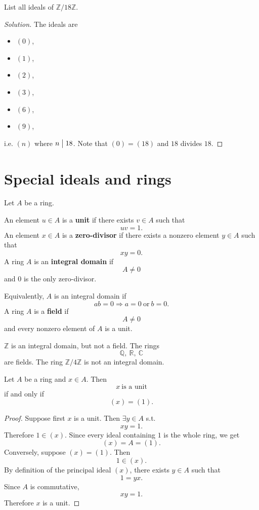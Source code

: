 \documentclass[11pt]{article}
\begin{document}
\begin{prob}
    List all ideals of $\mathbb Z/18\mathbb Z$. 
\end{prob}
\begin{proof}[Solution]
    The ideals are 
    \begin{itemize}
        \item $(0)$, 
        \item $(1)$,
        \item $(2)$, 
        \item $(3)$, 
        \item $(6)$, 
        \item $(9)$,  
    \end{itemize}
    i.e. $(n)$ where $n \bigm| 18$. 
    Note that $(0) = (18)$ and $18$ divides $18$.
\end{proof}

\section{Special ideals and rings}

\begin{defn}
    Let $A$ be a ring. 

    An element $u \in A$ is a \textbf{unit} if there 
    exists $v \in A$ such that 
    \[
        uv = 1.
    \]
    An element $x \in A$ is a \textbf{zero-divisor} 
    if there exists a nonzero element $y \in A$ 
    such that 
    \[
        xy = 0.
    \]
    A ring $A$ is an \textbf{integral domain} if 
    \[
        A \neq 0
    \]
    and $0$ is the only zero-divisor. 

    Equivalently, $A$ is an integral domain if 
    \[
        ab = 0 \Rightarrow a = 0 \ \text{or} \ b = 0. 
    \]
    A ring $A$ is a \textbf{field} if 
    \[
        A \neq 0
    \]
    and every nonzero element of $A$ is a unit. 
\end{defn}
\begin{ex}
    $\mathbb Z$ is an integral domain, but not a field. 
    The rings 
    \[
        \mathbb Q, \ \mathbb R, \ \mathbb C
    \]
    are fields. 
    The ring $\mathbb Z/4 \mathbb Z$ is not an integral 
    domain. 
\end{ex}

\begin{prop}
    Let $A$ be a ring and $x \in A$. Then 
    \[
        x \ \text{is a unit}
    \]
    if and only if 
    \[
        (x) = (1).
    \]
\end{prop}
\begin{proof}
    Suppose first $x$ is a unit. Then $\exists y \in A$ 
    s.t. 
    \[
        xy = 1. 
    \]
    Therefore $1 \in (x)$. Since every ideal 
    containing $1$ is the whole ring, we get 
    \[
        (x) = A = (1).
    \]
    Conversely, suppose $(x) = (1)$. 
    Then 
    \[
        1 \in (x). 
    \]
    By definition of the principal ideal $(x)$, there exists 
    $y \in A$ such that 
    \[
        1 = yx. 
    \]
    Since $A$ is commutative, 
    \[
        xy = 1.
    \]
    Therefore $x$ is a unit.
\end{proof}
\end{document}
